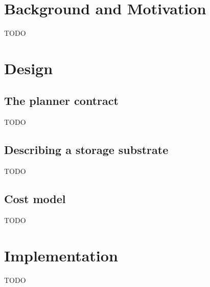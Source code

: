 \documentclass[letterpaper,twocolumn,10pt]{article}
\begin{document}
\section{Background and Motivation}

TODO

\section{Design}
%

\subsection{The planner contract}
TODO

\subsection{Describing a storage substrate}
TODO

\subsection{Cost model}
TODO

\section{Implementation}
TODO
\end{document}
